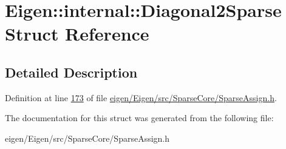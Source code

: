 \hypertarget{struct_eigen_1_1internal_1_1_diagonal2_sparse}{}\section{Eigen\+:\+:internal\+:\+:Diagonal2\+Sparse Struct Reference}
\label{struct_eigen_1_1internal_1_1_diagonal2_sparse}


\subsection{Detailed Description}


Definition at line \hyperlink{eigen_2_eigen_2src_2_sparse_core_2_sparse_assign_8h_source_l00173}{173} of file \hyperlink{eigen_2_eigen_2src_2_sparse_core_2_sparse_assign_8h_source}{eigen/\+Eigen/src/\+Sparse\+Core/\+Sparse\+Assign.\+h}.



The documentation for this struct was generated from the following file\+:\begin{DoxyCompactItemize}
\item 
eigen/\+Eigen/src/\+Sparse\+Core/\+Sparse\+Assign.\+h\end{DoxyCompactItemize}
